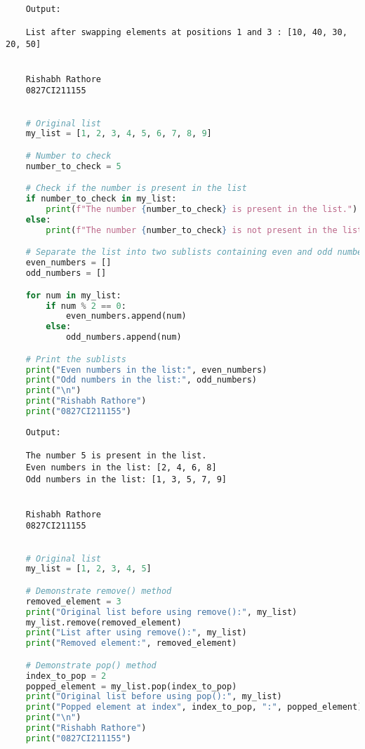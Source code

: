 \documentclass{report}
\begin{document}
\begin{verbatim}
	
	Output:

	List after swapping elements at positions 1 and 3 : [10, 40, 30, 20, 50]


	Rishabh Rathore
	0827CI211155
\end{verbatim}
\bigskip


\sol{}
\begin{lstlisting}[language=Python]

	# Original list
	my_list = [1, 2, 3, 4, 5, 6, 7, 8, 9]

	# Number to check
	number_to_check = 5

	# Check if the number is present in the list
	if number_to_check in my_list:
		print(f"The number {number_to_check} is present in the list.")
	else:
		print(f"The number {number_to_check} is not present in the list.")

	# Separate the list into two sublists containing even and odd numbers
	even_numbers = []
	odd_numbers = []

	for num in my_list:
		if num % 2 == 0:
			even_numbers.append(num)
		else:
			odd_numbers.append(num)

	# Print the sublists
	print("Even numbers in the list:", even_numbers)
	print("Odd numbers in the list:", odd_numbers)
	print("\n")
	print("Rishabh Rathore")
	print("0827CI211155")
\end{lstlisting}

\begin{verbatim}
	Output:

	The number 5 is present in the list.
	Even numbers in the list: [2, 4, 6, 8]
	Odd numbers in the list: [1, 3, 5, 7, 9]
	
	
	Rishabh Rathore
	0827CI211155
\end{verbatim}
\bigskip


\sol{}
\begin{lstlisting}[language=Python]

	# Original list
	my_list = [1, 2, 3, 4, 5]

	# Demonstrate remove() method
	removed_element = 3
	print("Original list before using remove():", my_list)
	my_list.remove(removed_element)
	print("List after using remove():", my_list)
	print("Removed element:", removed_element)

	# Demonstrate pop() method
	index_to_pop = 2
	popped_element = my_list.pop(index_to_pop)
	print("Original list before using pop():", my_list)
	print("Popped element at index", index_to_pop, ":", popped_element)
	print("\n")
	print("Rishabh Rathore")
	print("0827CI211155")

\end{lstlisting}
\end{document}
